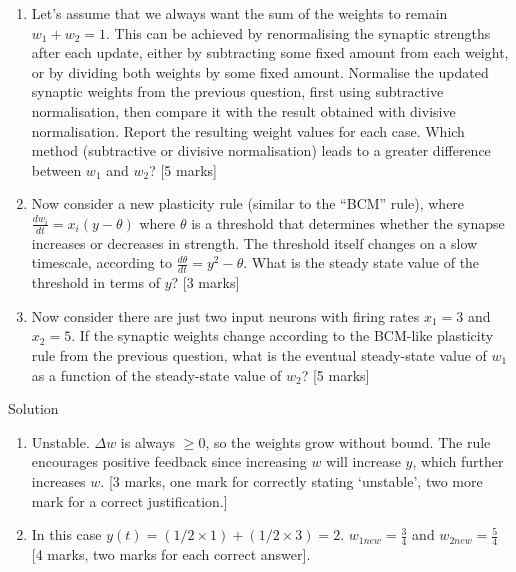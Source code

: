 \documentclass[a4paper,12pt]{article}
\newif\ifsoln
\begin{document}
\begin{enumerate}
\begin{enumerate}
 

\item Let's assume that we always want the sum of the weights to remain $w_1 + w_2 = 1$. This can be achieved by renormalising the synaptic strengths after each update, either by subtracting some fixed amount from each weight, or by dividing both weights by some fixed amount. Normalise the updated synaptic weights from the previous question, first using subtractive normalisation, then compare it with the result obtained with divisive normalisation. Report the resulting weight values for each case. Which method (subtractive or divisive normalisation) leads to a greater difference between $w_1$ and $w_2$? [5 marks]

 

\item Now consider a new plasticity rule (similar to the ``BCM'' rule), where $\frac{dw_i}{dt} = x_i(y-\theta)$ where $\theta$ is a threshold that determines whether the synapse increases or decreases in strength. The threshold itself changes on a slow timescale, according to $\frac{d \theta}{dt} = y^2 - \theta$. What is the steady state value of the threshold in terms of $y$? [3 marks]

 

\item Now consider there are just two input neurons with firing rates $x_1 = 3$ and $x_2 = 5$. If the synaptic weights change according to the BCM-like plasticity rule from the previous question, what is the eventual steady-state value of $w_1$ as a function of the steady-state value of $w_2$? [5 marks]

 

\end{enumerate}

\ifsoln Solution

\begin{enumerate}

\item Unstable. $\Delta w$ is always $\geq 0$, so the weights grow without bound. The rule encourages positive feedback since increasing $w$ will increase $y$, which further increases $w$. [3 marks, one mark for correctly stating `unstable', two more mark for a correct justification.]

\item In this case $y(t)= (1/2 \times 1)+(1/2 \times 3)=2$.
$w_{1new} = \frac{3}{4}$ and $w_{2new} = \frac{5}{4}$ [4 marks, two marks for each correct answer].


\end{enumerate}
\end{enumerate}
\end{document}
